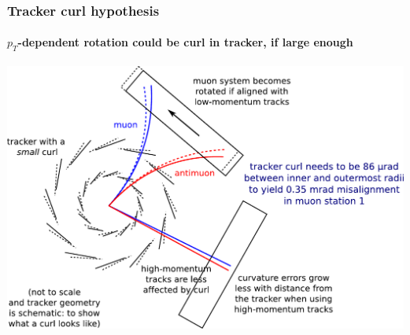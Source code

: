 \documentclass[compress]{beamer}
\begin{document}
\begin{frame}
\frametitle{Tracker curl hypothesis}
\framesubtitle{$p_T$-dependent rotation could be curl in tracker, if large enough}
\includegraphics[width=\linewidth]{curl_explanation.pdf}
\end{frame}
\end{document}

